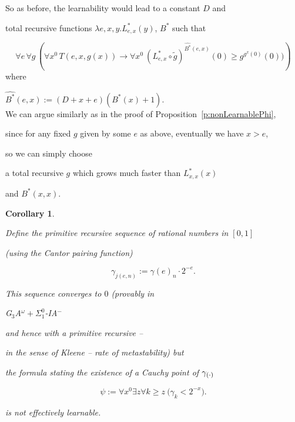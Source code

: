 \documentclass[1p]{elsarticle}
\theoremstyle{plain}
\newtheorem{cor}[thm]{Corollary}
\theoremstyle{definition}
\theoremstyle{remark}
\renewenvironment{proof}[1][]{\noindent{\bf Proof{#1}. }}{\nopagebreak[4]{\hspace*{\fill}


  $\Box$              %

 }{\vspace{2ex}}}
\theoremstyle{definition}
\begin{document}
{\begin{proof}
So as before, the learnability would lead to a constant $D$ and 

total recursive functions $\lambda e,x,y.

L^*_{e,x}(y)$, $B^*$ such that

\[ \forall e\,\forall g\,\left(\forall x^0 \,T(e,x,g(x))\rightarrow 

\forall x^0\ (L^*_{e,x}\circ \tilde{g})^{\widehat{B^*}(e,x)}(0)

\geq g^{g^{x}(0)}(0))\right)\] where 

$\widehat{B^*}(e,x):=(D+x+e)(B^*(x)+1).$  \\ 

We can argue similarly as in the proof of Proposition~\ref{p:nonLearnablePhi}, 

since for any fixed $g$ given by some $e$ as above, eventually we have $x>e$, 

so we can simply choose

a total recursive $g$ which grows much faster than $L^*_{x,x}(x)$ 

and $B^*(x,x)$.

\end{proof}



\begin{cor}\label{c:gammaee}

Define the primitive recursive sequence of rational numbers in $[0,1]$  

(using the Cantor pairing function)

\[

\gamma_{j(e,n)}:= \gamma(e)_n\cdot 2^{-e}.

\]

This sequence converges to $0$ (provably in {\rm 

G$_3$A$^{\omega}+\Sigma^0_1$-IA$^-$} and hence with a primitive recursive -- 

in the sense of Kleene -- rate of metastability) but 

the formula stating the existence of a Cauchy point of $\gamma_{(\cdot)}$

\[

\psi:=\forall x^0\exists z \forall k\geq z\ \big( \gamma_k<2^{-x} \big).

\]

is not effectively learnable.

\end{cor}

\begin{proof} 


\end{proof}}
\end{document}

